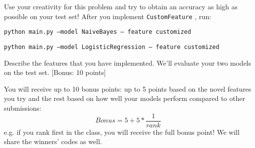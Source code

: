 \begin{enumerate}
Use your creativity for this problem and try to obtain an accuracy as high as possible on your test
set! After you implement \texttt{CustomFeature} , run:

\texttt{python main.py --model NaiveBayes -- feature customized}

\texttt{python main.py --model LogisticRegression -- feature customized}

Describe the features that you have implemented. We’ll evaluate your two models on the test set. [Bonus: 10 points]

You will receive up to 10 bonus points: up to 5 points based on
the novel features you try and the rest based on how well your models perform compared to other submissions:
$$
Bonus = 5 + 5 * \frac{1}{rank}
$$
e.g. if you rank first in the class, you will receive the full bonus point! We will share the winners' codes as well.

\end{enumerate}

